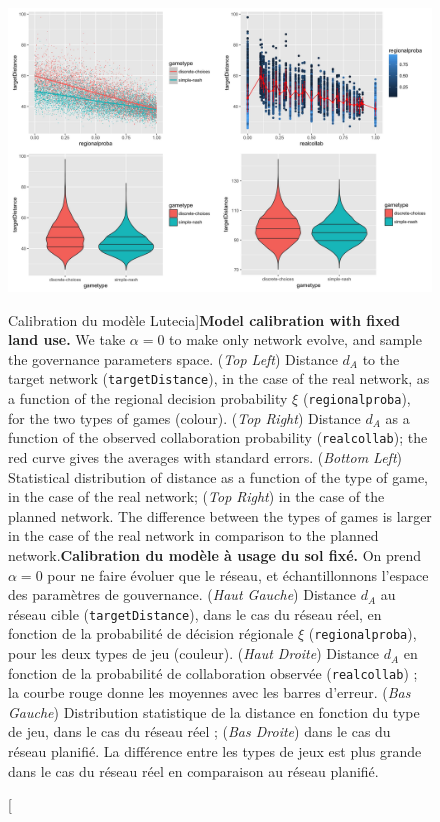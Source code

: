 \begin{figure}
	\includegraphics[width=\linewidth]{Figures/Final/7-3-3-fig-lutecia-calib.jpg}
	\caption[Calibration of the Lutecia model][Calibration du modèle Lutecia]{\textbf{Model calibration with fixed land use.} We take $\alpha = 0$ to make only network evolve, and sample the governance parameters space. (\textit{Top Left}) Distance $d_A$ to the target network (\texttt{targetDistance}), in the case of the real network, as a function of the regional decision probability $\xi$ (\texttt{regionalproba}), for the two types of games (colour). (\textit{Top Right}) Distance $d_A$ as a function of the observed collaboration probability (\texttt{realcollab}); the red curve gives the averages with standard errors. (\textit{Bottom Left}) Statistical distribution of distance as a function of the type of game, in the case of the real network; (\textit{Top Right}) in the case of the planned network. The difference between the types of games is larger in the case of the real network in comparison to the planned network.\label{fig:lutecia:calib}}{\textbf{Calibration du modèle à usage du sol fixé.} On prend $\alpha = 0$ pour ne faire évoluer que le réseau, et échantillonnons l'espace des paramètres de gouvernance. (\textit{Haut Gauche}) Distance $d_A$ au réseau cible (\texttt{targetDistance}), dans le cas du réseau réel, en fonction de la probabilité de décision régionale $\xi$ (\texttt{regionalproba}), pour les deux types de jeu (couleur). (\textit{Haut Droite}) Distance $d_A$ en fonction de la probabilité de collaboration observée (\texttt{realcollab}) ; la courbe rouge donne les moyennes avec les barres d'erreur. (\textit{Bas Gauche}) Distribution statistique de la distance en fonction du type de jeu, dans le cas du réseau réel ; (\textit{Bas Droite}) dans le cas du réseau planifié. La différence entre les types de jeux est plus grande dans le cas du réseau réel en comparaison au réseau planifié.\label{fig:lutecia:calib}}
\end{figure}


